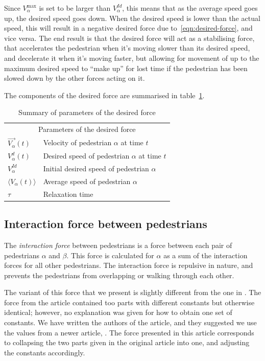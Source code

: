 Since $V^{\text{max}}_\alpha$ is set to be larger than $V^{Id}_\alpha$, this 
means that as the average speed goes up, the desired speed goes down.  When 
the desired speed is lower than the actual speed, this will result in a 
negative desired force due to~\eqref{eqn:desired-force}, and vice versa. The 
end result is that the desired force will act as a stabilising force, that 
accelerates the pedestrian when it's moving slower than its desired speed, and 
decelerate it when it's moving faster, but allowing for movement of up to the 
maximum desired speed to ``make up'' for lost time if the pedestrian has been 
slowed down by the other forces acting on it.

The components of the desired force are summarised in 
table~\ref{tbl:desired-force}.

\begin{table}[h]
    \centering
    \begin{tabular}{l l}
        \toprule
        \multicolumn{2}{c}{\textsf{Parameters of the desired force}}\\
        $\overrightarrow{V_{\alpha}}(t)$ & Velocity of pedestrian $\alpha$ 
        at time $t$\\
        $V_{\alpha}^{d}(t)$ & Desired speed of pedestrian $\alpha$ at time 
        $t$\\
        $V_{\alpha}^{Id}$ & Initial desired speed of pedestrian $\alpha$ \\
        $\langle V_{\alpha}(t) \rangle$ & Average speed of pedestrian 
        $\alpha$ \\
        $\tau$& Relaxation time \\
        \bottomrule
    \end{tabular}
    \caption{Summary of parameters of the desired force}
    \label{tbl:desired-force}
\end{table}

\subsection{Interaction force between pedestrians}
\label{seq:interaction-pedestrians}
The \emph{interaction force} between pedestrians is a force between each pair 
of pedestrians $\alpha$ and $\beta$. This force is calculated for $\alpha$ as 
a sum of the interaction forces for all other pedestrians. The interaction 
force is repulsive in nature, and prevents the pedestrians from overlapping or 
walking through each other.

The variant of this force that we present is slightly different from the one 
in \cite{self-org}.  The force from the article contained too parts with 
different constants but otherwise identical; however, no explanation was given 
for how to obtain one set of constants. We have written the authors of the 
article, and they suggested we use the values from a newer article, 
\cite{ABconstant}. The force presented in this article corresponds to 
collapsing the two parts given in the original article into one, and adjusting 
the constants accordingly.

